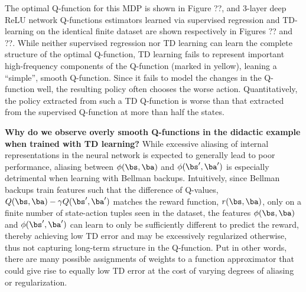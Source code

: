 The optimal Q-function for this MDP is shown in Figure ??, and 3-layer deep ReLU network Q-functions estimators learned via supervised regression and TD-learning on the identical finite dataset are shown respectively in Figures ?? and ??. While neither supervised regression nor TD learning can learn the complete structure of the optimal Q-function, TD learning fails to represent important high-frequency components of the Q-function (marked in yellow), leaning a ``simple'', smooth Q-function. Since it fails to model the changes in the Q-function well, the resulting policy often chooses the worse action. Quantitatively, the policy extracted from such a TD Q-function is worse than that extracted from the supervised Q-function at more than half the states.  

\textbf{Why do we observe overly smooth Q-functions in the didactic example when trained with TD learning?}  While excessive aliasing of internal representations in the neural network is expected to generally lead to poor performance, aliasing between $\phi(\bs, \ba)$ and $\phi(\bs', \ba')$ is especially detrimental when learning with Bellman backups. Intuitively, since Bellman backups train features such that the difference of Q-values, $Q(\bs, \ba) - \gamma Q(\bs', \ba')$ matches the reward function, $r(\bs, \ba)$, only on a finite number of state-action tuples seen in the dataset, the features $\phi(\bs, \ba)$ and $\phi(\bs', \ba')$ can learn to only be sufficiently different to predict the reward, thereby achieving low TD error and may be excessively regularized otherwise, thus not capturing long-term structure in the Q-function. Put in other words, there are many possible assignments of weights to a function approximator that could give rise to equally low TD error at the cost of varying degrees of aliasing or regularization.


